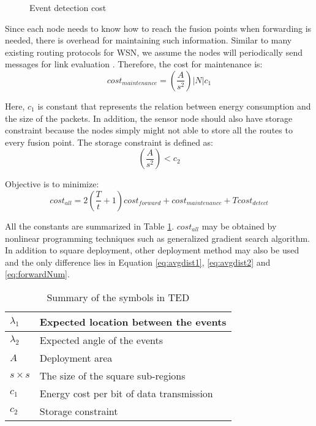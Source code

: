 \begin{figure}
\centering
{}
\caption{Event detection cost}
\label{fig:cedu-detectionCost}
\end{figure}

Since each node needs to know how to reach the fusion points when forwarding is needed, there is overhead for maintaining such information. Similar to many existing routing protocols for WSN, we assume the nodes will periodically send messages for link evaluation \cite{rssiroute}. Therefore, the cost for maintenance is:
\begin{displaymath}
cost_{maintenance}=(\frac{A}{s^2})|N|c_1
\end{displaymath}

Here, \(c_1\) is constant that represents the relation between energy consumption and the size of the packets. In addition, the sensor node should also have storage constraint because the nodes simply might not able to store all the routes to every fusion point. The storage constraint is defined as:
\begin{displaymath}
(\frac{A}{s^2})<c_2
\end{displaymath}

Objective is to minimize:
\begin{displaymath}
cost_{all}=2(\frac{T}{t}+1)cost_{forward}+cost_{maintenance}+Tcost_{detect}
\end{displaymath}

All the constants are summarized in Table \ref{tab:ceduConstants}. \(cost_{all}\) may be obtained by nonlinear programming techniques such as generalized gradient search algorithm. In addition to square deployment, other deployment method may also be used and the only difference lies in Equation \ref{eq:avgdist1}, \ref{eq:avgdist2} and \ref{eq:forwardNum}.

\begin{table}
\begin{center}
\begin{tabular}{ | p{1cm} | p{5cm} | }
\hline
\({\lambda}_1\) & Expected location between the events \\ \hline
\({\lambda}_2\) & Expected angle of the events \\ \hline
\(A\) & Deployment area \\ \hline
\(s\times s\) & The size of the square sub-regions \\ \hline
\(c_1\) & Energy cost per bit of data transmission\\ \hline
\(c_2\) & Storage constraint\\ \hline
\end{tabular}
\end{center}
\caption{Summary of the symbols in TED}
\label{tab:ceduConstants}
\end{table}


